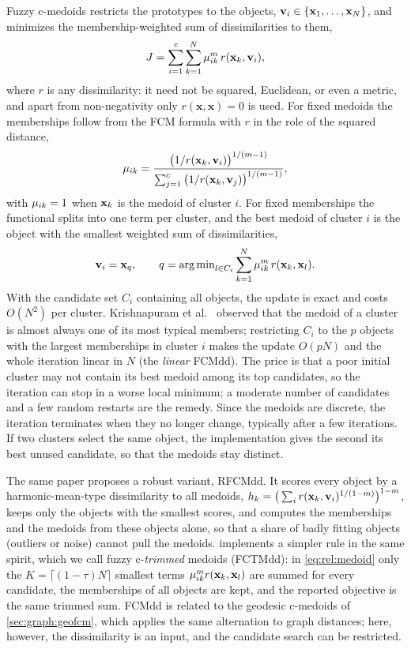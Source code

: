Fuzzy c-medoids restricts the prototypes to the objects, $\mathbf{v}_i\in\{\mathbf{x}_1,\dots,\mathbf{x}_N\}$, and minimizes the membership-weighted sum of dissimilarities to them,
\begin{equation}
  J=\sum_{i=1}^{c}\sum_{k=1}^{N}\mu_{ik}^m\,r(\mathbf{x}_k,\mathbf{v}_i),
  \label{eq:rel:fcmdd}
\end{equation}
where $r$ is any dissimilarity: it need not be squared, Euclidean, or even a metric, and apart from non-negativity only $r(\mathbf{x},\mathbf{x})=0$ is used. For fixed medoids the memberships follow from the FCM formula with $r$ in the role of the squared distance,
\begin{equation}
  \mu_{ik}=\frac{\big(1/r(\mathbf{x}_k,\mathbf{v}_i)\big)^{1/(m-1)}}{\sum_{j=1}^{c}\big(1/r(\mathbf{x}_k,\mathbf{v}_j)\big)^{1/(m-1)}},
  \label{eq:rel:fcmdd:mu}
\end{equation}
with $\mu_{ik}=1$ when $\mathbf{x}_k$ is the medoid of cluster $i$. For fixed memberships the functional splits into one term per cluster, and the best medoid of cluster $i$ is the object with the smallest weighted sum of dissimilarities,
\begin{equation}
  \mathbf{v}_i=\mathbf{x}_q,\qquad q=\operatorname{arg\,min}_{l\in C_i}\sum_{k=1}^{N}\mu_{ik}^m\,r(\mathbf{x}_k,\mathbf{x}_l).
  \label{eq:rel:medoid}
\end{equation}
With the candidate set $C_i$ containing all objects, the update is exact and costs $O(N^2)$ per cluster. Krishnapuram et al.\ \cite{krishnapuram:2001:fcmdd} observed that the medoid of a cluster is almost always one of its most typical members; restricting $C_i$ to the $p$ objects with the largest memberships in cluster $i$ makes the update $O(pN)$ and the whole iteration linear in $N$ (the \emph{linear} FCMdd). The price is that a poor initial cluster may not contain its best medoid among its top candidates, so the iteration can stop in a worse local minimum; a moderate number of candidates and a few random restarts are the remedy. Since the medoids are discrete, the iteration terminates when they no longer change, typically after a few iterations. If two clusters select the same object, the implementation gives the second its best unused candidate, so that the medoids stay distinct.

The same paper proposes a robust variant, RFCMdd. It scores every object by a harmonic-mean-type dissimilarity to all medoids, $h_k=\big(\sum_i r(\mathbf{x}_k,\mathbf{v}_i)^{1/(1-m)}\big)^{1-m}$, keeps only the objects with the smallest scores, and computes the memberships and the medoids from these objects alone, so that a share of badly fitting objects (outliers or noise) cannot pull the medoids.  implements a simpler rule in the same spirit, which we call fuzzy c-\emph{trimmed} medoids (FCTMdd): in \eqref{eq:rel:medoid} only the $K=\lceil(1-\tau)N\rceil$ smallest terms $\mu_{ik}^m r(\mathbf{x}_k,\mathbf{x}_l)$ are summed for every candidate, the memberships of all objects are kept, and the reported objective is the same trimmed sum. FCMdd is related to the geodesic c-medoids of \cref{sec:graph:geofcm}, which applies the same alternation to graph distances; here, however, the dissimilarity is an input, and the candidate search can be restricted.

